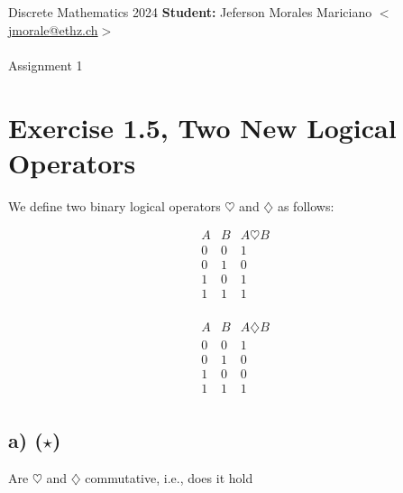 \documentclass[unicode,11pt,a4paper,oneside,numbers=endperiod,openany]{scrartcl}
\begin{document}
\setassignment
{}

\serieheader
{Discrete Mathematics}
{2024}
{%
\textbf{Student:} Jeferson Morales Mariciano 
\href{mailto:jmorale@ethz.ch}{\(<\)jmorale@ethz.ch\(>\)} \\\\}
{\vspace{-1cm}}%
{Assignment 1}{}

\section{Exercise 1.5, Two New Logical Operators}

We define two binary logical operators \( \heartsuit \) and \( \diamondsuit \) as follows:

\begin{center}
\begin{minipage}{0.3\textwidth}

\[
\begin{array}{c|c||c}
A & B & A \heartsuit B \\
\hline
0 & 0 & 1 \\
0 & 1 & 0 \\
1 & 0 & 1 \\
1 & 1 & 1 \\
\end{array}
\]

\end{minipage}
\begin{minipage}{0.3\textwidth}

\[
\begin{array}{c|c||c}
A & B & A \diamondsuit B \\
\hline
0 & 0 & 1 \\
0 & 1 & 0 \\
1 & 0 & 0 \\
1 & 1 & 1 \\
\end{array}
\]

\end{minipage}
\end{center}

\subsection*{a) (\(\star\))}  
Are \(\heartsuit\) and \(\diamondsuit\) commutative, i.e., does it hold
\end{document}
